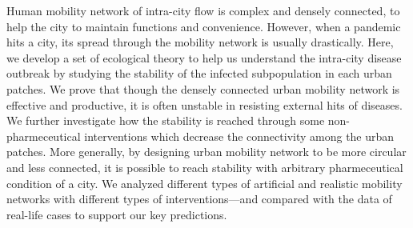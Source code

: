 Human mobility network of intra-city flow is complex and densely connected, to help the city to maintain functions and convenience. However, when a pandemic hits a city, its spread through the mobility network is usually drastically. Here, we develop a set of ecological theory to help us understand the intra-city disease outbreak by studying the stability of the infected subpopulation in each urban patches. We prove that though the densely connected urban mobility network is effective and productive, it is often unstable in resisting external hits of diseases. We further investigate how the stability is reached through some non-pharmeceutical interventions which decrease the connectivity among the urban patches. More generally, by designing urban mobility network to be more circular and less connected, it is possible to reach stability with arbitrary pharmeceutical condition of a city. We analyzed different types of artificial and realistic mobility networks with different types of interventions—and compared with the data of real-life cases to support our key predictions.